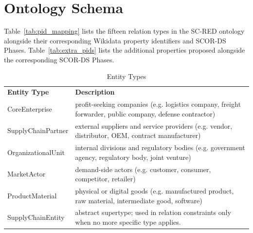 \section{Ontology Schema}
\label{app:ontology}

Table~\ref{tab:pid_mapping} lists the fifteen relation types in the
SC-RED ontology alongside their corresponding Wikidata property
identifiers and SCOR-DS Phases. Table~\ref{tab:extra_pids} lists the additional properties proposed alongside the corresponding SCOR-DS Phases.

\begin{table}[h]
\centering
\caption{Entity Types}
\label{tab:entity_types}
\begin{tabular}{ll}
\textbf{Entity Type} & \textbf{Description}\\
CoreEnterprise      & profit-seeking companies
                         (e.g. logistics company, freight forwarder, 
                          public company, defense contractor) \\
SupplyChainPartner  & external suppliers and service providers
                         (e.g. vendor, distributor, OEM, 
                          contract manufacturer) \\
OrganizationalUnit  & internal divisions and regulatory bodies
                         (e.g. government agency, regulatory body, 
                          joint venture) \\
MarketActor         & demand-side actors
                         (e.g. customer, consumer, competitor, retailer) \\
ProductMaterial     & physical or digital goods
                         (e.g. manufactured product, raw material, 
                          intermediate good, software)\\
SupplyChainEntity   & abstract supertype; used in relation constraints
                         only when no more specific type applies.\\
\end{tabular}
\end{table}

